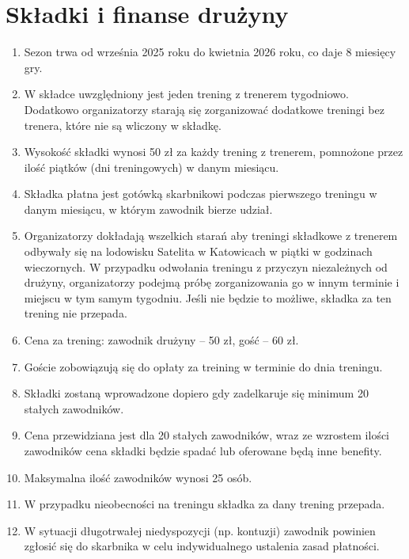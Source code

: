 \documentclass[12pt,a4paper]{article}
\let\stdsection\section
\renewcommand\section{\clearpage\stdsection}
\begin{document}
\section{Składki i finanse drużyny}
\begin{enumerate}
  \item Sezon trwa od września 2025 roku do kwietnia 2026 roku, co daje 8 miesięcy gry.
  \item W składce uwzględniony jest jeden trening z trenerem tygodniowo. Dodatkowo organizatorzy starają się zorganizować dodatkowe treningi bez trenera, które nie są wliczony w składkę.
  \item Wysokość składki wynosi 50 zł za każdy trening z trenerem, pomnożone przez ilość piątków (dni treningowych) w danym miesiącu.
  \item Składka płatna jest gotówką skarbnikowi podczas pierwszego treningu w danym miesiącu, w którym zawodnik bierze udział.
  \item Organizatorzy dokładają wszelkich starań aby treningi składkowe z trenerem odbywały się na lodowisku Satelita w Katowicach w piątki w godzinach wieczornych. W przypadku odwołania treningu z przyczyn niezależnych od drużyny, organizatorzy podejmą próbę zorganizowania go w innym terminie i miejscu w tym samym tygodniu. Jeśli nie będzie to możliwe, składka za ten trening nie przepada.
  \item Cena za trening: zawodnik drużyny -- 50 zł, gość -- 60 zł.
  \item Goście zobowiązują się do opłaty za treining w terminie do dnia treningu.
  \item Składki zostaną wprowadzone dopiero gdy zadelkaruje się minimum 20 stałych zawodników.
  \item Cena przewidziana jest dla 20 stałych zawodników, wraz ze wzrostem ilości zawodników cena składki będzie spadać lub oferowane będą inne benefity.
  \item Maksymalna ilość zawodników wynosi 25 osób.
  \item W przypadku nieobecności na treningu składka za dany trening przepada.
  \item W sytuacji długotrwałej niedyspozycji (np. kontuzji) zawodnik powinien zgłosić się do skarbnika w celu indywidualnego ustalenia zasad płatności.
\end{enumerate}
\end{document}
